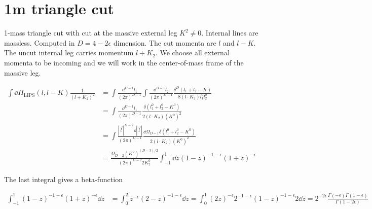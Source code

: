\section{1m triangle cut}
1-mass triangle cut with cut at the massive external leg $K^2 \neq 0$.
Internal lines are massless. 
Computed in $D=4-2\epsilon$ dimension.
The cut momenta are $l$ and $l-K$.
The uncut internal leg carries momentum $l + K_2$. 
We choose all external momenta to be incoming and we will work in the center-of-mass frame of the massive leg.

\begin{equation*}
\begin{split}
\int\dd \Pi_{\textrm{LIPS}}(l, l-K) \frac{1}{(l+K_2)^2} & =
\int\frac{\dd^{D-1}l_1}{(2\pi)^{D-1}}\int\frac{\dd^{D-1}l_2}{(2\pi)^{D-1}}
\frac{\delta^{D}(l_1 + l_2 - K)}{8(l\cdot K_2)l_1^0 l_2^0}
\\
& = \int\frac{\dd^{D-1}l_1}{(2\pi)^{D-1}}\frac{\delta(l_1^0 + l_2^0 - K^0)}{2(l\cdot K_2)(K^0)^2} 
\\
& = \int\frac{|\vec{l}|^{D-2}\dd |\vec{l}|}{(2\pi)^{D-1}} \frac{\dd\Omega_{D-1}\delta(l_1^0 + l_2^0 - K^0)}{2 ( l \cdot K_2)(K^0)^2}
\\
& = \frac{\Omega_{D-2}(K^2)^{(D-3)/2}}{(2\pi)^{D-2}2K_2^0} \int_{-1}^1\dd z (1-z)^{-1-\epsilon}(1+z)^{-\epsilon}
\end{split} 
\end{equation*}

The last integral gives a beta-function

\begin{equation*}
\begin{split}
\int^1_{-1} (1-z)^{-1-\epsilon}(1+z)^{-\epsilon} \dd z & = 
\int^2_{0} z^{-\epsilon}(2-z)^{-1-\epsilon} \dd z 
=\int^1_0(2z)^{-\epsilon} 2^{-1-\epsilon} (1-z)^{-1-\epsilon} 2 \dd z
=2^{-2\epsilon}\frac{\Gamma(-\epsilon)\Gamma(1-\epsilon)}{\Gamma(1-2\epsilon)}
\end{split}
\end{equation*}
